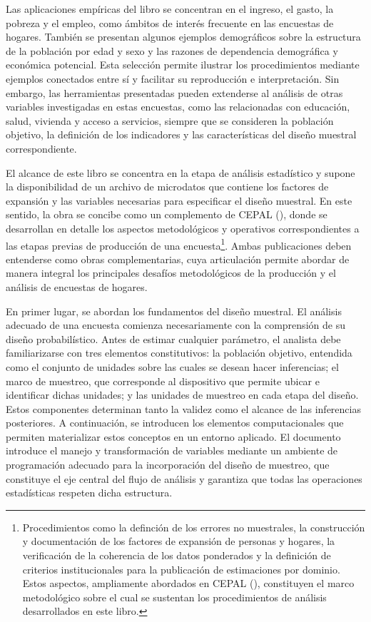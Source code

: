 \documentclass[
  spanish,
  11pt,
  letterpaper,
  oneside,
  open=any]{scrbook}
\begin{document}
Las aplicaciones empíricas del libro se concentran en el ingreso, el
gasto, la pobreza y el empleo, como ámbitos de interés frecuente en las
encuestas de hogares. También se presentan algunos ejemplos demográficos
sobre la estructura de la población por edad y sexo y las razones de
dependencia demográfica y económica potencial. Esta selección permite
ilustrar los procedimientos mediante ejemplos conectados entre sí y
facilitar su reproducción e interpretación. Sin embargo, las
herramientas presentadas pueden extenderse al análisis de otras
variables investigadas en estas encuestas, como las relacionadas con
educación, salud, vivienda y acceso a servicios, siempre que se
consideren la población objetivo, la definición de los indicadores y las
características del diseño muestral correspondiente.

El alcance de este libro se concentra en la etapa de análisis
estadístico y supone la disponibilidad de un archivo de microdatos que
contiene los factores de expansión y las variables necesarias para
especificar el diseño muestral. En este sentido, la obra se concibe como
un complemento de CEPAL (), donde se
desarrollan en detalle los aspectos metodológicos y operativos
correspondientes a las etapas previas de producción de una
encuesta\footnote{Procedimientos como la definción de los errores no
  muestrales, la construcción y documentación de los factores de
  expansión de personas y hogares, la verificación de la coherencia de
  los datos ponderados y la definición de criterios institucionales para
  la publicación de estimaciones por dominio. Estos aspectos,
  ampliamente abordados en CEPAL (),
  constituyen el marco metodológico sobre el cual se sustentan los
  procedimientos de análisis desarrollados en este libro.}. Ambas
publicaciones deben entenderse como obras complementarias, cuya
articulación permite abordar de manera integral los principales desafíos
metodológicos de la producción y el análisis de encuestas de hogares.

En primer lugar, se abordan los fundamentos del diseño muestral. El
análisis adecuado de una encuesta comienza necesariamente con la
comprensión de su diseño probabilístico. Antes de estimar cualquier
parámetro, el analista debe familiarizarse con tres elementos
constitutivos: la población objetivo, entendida como el conjunto de
unidades sobre las cuales se desean hacer inferencias; el marco de
muestreo, que corresponde al dispositivo que permite ubicar e
identificar dichas unidades; y las unidades de muestreo en cada etapa
del diseño. Estos componentes determinan tanto la validez como el
alcance de las inferencias posteriores. A continuación, se introducen
los elementos computacionales que permiten materializar estos conceptos
en un entorno aplicado. El documento introduce el manejo y
transformación de variables mediante un ambiente de programación
adecuado para la incorporación del diseño de muestreo, que constituye el
eje central del flujo de análisis y garantiza que todas las operaciones
estadísticas respeten dicha estructura.
\end{document}

